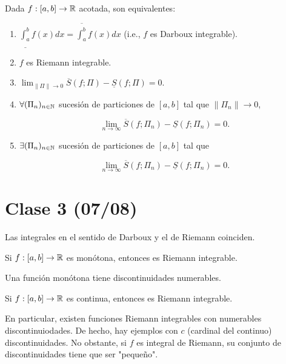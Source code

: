 \documentclass[a4paper]{report}
\begin{document}
	\begin{theorem}
		Dada $f:[a,b]\to\mathbb{R}$ acotada, son equivalentes:

		\begin{enumerate}
			\item $\underline{\int_{a}^{b}} f(x) dx = \overline{\int_{a}^{b}} f(x) dx$ (i.e., $f$ es Darboux integrable).

			\item $f$ es Riemann integrable.

			\item $\lim_{\|\Pi\|\to 0} \overline{S}(f;\Pi)-\underline{S}(f;\Pi)=0$.

			\item $\forall (\Pi_n)_{n\in\mathbb{N}}$ sucesión de particiones de $[a,b]$ tal que $\|\Pi_n\|\to 0$, 

			\[
			\lim_{n \to \infty} \overline{S}(f;\Pi_n)-\underline{S}(f;\Pi_n)=0.
			\]

			\item $\exists (\Pi_n)_{n\in\mathbb{N}}$ sucesión de particiones de $[a,b]$ tal que 

			\[
			\lim_{n \to \infty}\overline{S}(f;\Pi_n)-\underline{S}(f;\Pi_n)=0.
			\]
		\end{enumerate}
	\end{theorem}

	\section{Clase 3 (07/08)}

	\begin{note}
		Las integrales en el sentido de Darboux y el de Riemann coinciden.
	\end{note}

	\begin{prop}
		Si $f:[a,b]\to\mathbb{R}$ es monótona, entonces es Riemann integrable.
	\end{prop}

	\begin{remark}
		Una función monótona tiene discontinuidades numerables.
	\end{remark}

	\begin{prop}
		Si $f:[a,b]\to\mathbb{R}$ es continua, entonces es Riemann integrable.
	\end{prop}

	En particular, existen funciones Riemann integrables con numerables discontinuiodades. De hecho, hay ejemplos con $c$ (cardinal del continuo) discontinuidades. No obstante, si $f$ es integral de Riemann, su conjunto de discontinuidades tiene que ser "pequeño".
\end{document}
